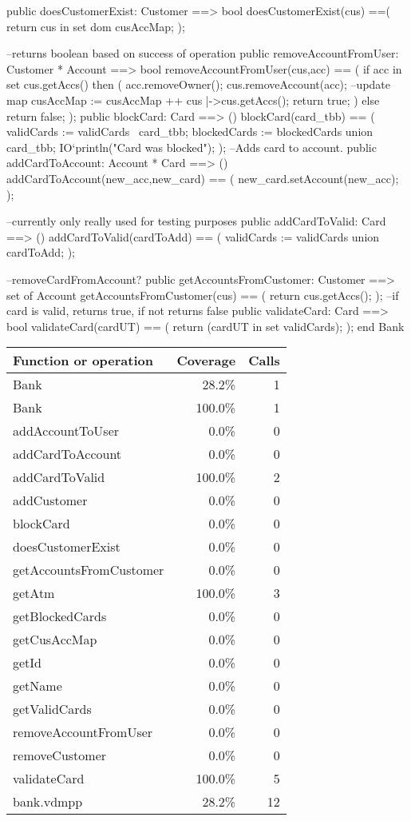 \documentclass[a4paper]{article}
\begin{document}
\begin{vdm_al}
    public doesCustomerExist: Customer ==> bool
    doesCustomerExist(cus) ==(
        return cus in set dom cusAccMap;
    );

    --returns boolean based on success of operation
    public removeAccountFromUser: Customer * Account ==> bool
    removeAccountFromUser(cus,acc) == (
        if acc in set cus.getAccs() then (
            acc.removeOwner();
            cus.removeAccount(acc);
            --update map
            cusAccMap := cusAccMap ++ {cus |->cus.getAccs()};
            return true;
        ) 
        else return false;
    );
    public blockCard: Card ==> ()
    blockCard(card_tbb) == (
        validCards := validCards \ {card_tbb};
        blockedCards := blockedCards union {card_tbb};
        IO`println("Card was blocked");
    );
    --Adds card to account. 
    public addCardToAccount: Account * Card ==> ()
    addCardToAccount(new_acc,new_card) == (
        new_card.setAccount(new_acc);
    );

    --currently only really used for testing purposes
    public addCardToValid: Card ==> () 
    addCardToValid(cardToAdd) == (
        validCards := validCards union {cardToAdd};
    );

    --removeCardFromAccount?
    public getAccountsFromCustomer: Customer ==> set of Account
    getAccountsFromCustomer(cus) == (
        return cus.getAccs();
    );
    --if card is valid, returns true, if not returns false
    public validateCard: Card ==> bool
    validateCard(cardUT) == (
        return (cardUT in set validCards);  
    );
end Bank
\end{vdm_al}
\bigskip
\begin{longtable}{|l|r|r|}
\hline
Function or operation & Coverage & Calls \\
\hline
\hline
Bank & 28.2\% & 1 \\
\hline
Bank & 100.0\% & 1 \\
\hline
addAccountToUser & 0.0\% & 0 \\
\hline
addCardToAccount & 0.0\% & 0 \\
\hline
addCardToValid & 100.0\% & 2 \\
\hline
addCustomer & 0.0\% & 0 \\
\hline
blockCard & 0.0\% & 0 \\
\hline
doesCustomerExist & 0.0\% & 0 \\
\hline
getAccountsFromCustomer & 0.0\% & 0 \\
\hline
getAtm & 100.0\% & 3 \\
\hline
getBlockedCards & 0.0\% & 0 \\
\hline
getCusAccMap & 0.0\% & 0 \\
\hline
getId & 0.0\% & 0 \\
\hline
getName & 0.0\% & 0 \\
\hline
getValidCards & 0.0\% & 0 \\
\hline
removeAccountFromUser & 0.0\% & 0 \\
\hline
removeCustomer & 0.0\% & 0 \\
\hline
validateCard & 100.0\% & 5 \\
\hline
\hline
bank.vdmpp & 28.2\% & 12 \\
\hline
\end{longtable}
\end{document}
